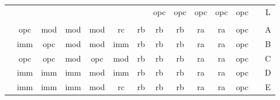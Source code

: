 \begin{table}[hbt!]
\begin{tabular}{c|c|c|c|c|c|c|c|c|c|c|c|r|c|}
\cline{8-12}\cline{14-14}
\multicolumn{1}{c}{}            & \multicolumn{1}{c}{} & \multicolumn{1}{c}{} & \multicolumn{1}{c}{} & \multicolumn{1}{c}{} & \multicolumn{1}{c}{} &                       & opc                  & opc                  & opc                  & opc                  & opc                  &                       & L                            \\ 
\cline{8-12}\cline{14-14}
\multicolumn{1}{l}{}            & \multicolumn{1}{l}{} & \multicolumn{1}{l}{} & \multicolumn{1}{l}{} & \multicolumn{1}{l}{} & \multicolumn{1}{l}{} & \multicolumn{1}{l}{}  & \multicolumn{1}{l}{} & \multicolumn{1}{l}{} & \multicolumn{1}{l}{} & \multicolumn{1}{l}{} & \multicolumn{1}{l}{} & \multicolumn{1}{l}{}  & \multicolumn{1}{l}{}         \\ 
\cline{2-12}\cline{14-14}
                                & opc                  & mod                  & mod                  & mod                  & rc                   & rb                    & rb                   & rb                   & ra                   & ra                   & opc                  &                       & A                            \\ 
\cline{2-12}\cline{14-14}
                                & imm                  & opc                  & mod                  & mod                  & imm                  & rb                    & rb                   & rb                   & ra                   & ra                   & opc                  &                       & B                            \\ 
\cline{2-12}\cline{14-14}
                                & opc                  & opc                  & mod                  & opc                  & mod                  & rb                    & rb                   & rb                   & ra                   & ra                   & opc                  &                       & C                            \\ 
\cline{2-12}\cline{14-14}
                                & imm                  & imm                  & imm                  & mod                  & imm                  & rb                    & rb                   & rb                   & ra                   & ra                   & opc                  &                       & D                            \\ 
\cline{2-12}\cline{14-14}
                                & imm                  & imm                  & imm                  & mod                  & rc                   & rb                    & rb                   & rb                   & ra                   & ra                   & opc                  &                       & E                            \\ 

\end{tabular}
\end{table}

